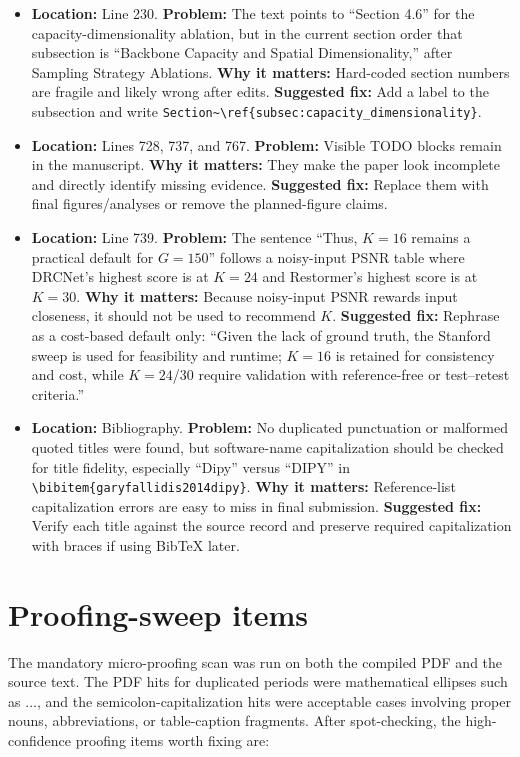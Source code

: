 \documentclass[11pt]{article}
\begin{document}
\begin{itemize}
  \item \textbf{Location:} Line 230. \textbf{Problem:} The text points to ``Section 4.6'' for the capacity-dimensionality ablation, but in the current section order that subsection is ``Backbone Capacity and Spatial Dimensionality,'' after Sampling Strategy Ablations. \textbf{Why it matters:} Hard-coded section numbers are fragile and likely wrong after edits. \textbf{Suggested fix:} Add a label to the subsection and write \texttt{Section\textasciitilde\textbackslash ref\{subsec:capacity\_dimensionality\}}.
  \item \textbf{Location:} Lines 728, 737, and 767. \textbf{Problem:} Visible TODO blocks remain in the manuscript. \textbf{Why it matters:} They make the paper look incomplete and directly identify missing evidence. \textbf{Suggested fix:} Replace them with final figures/analyses or remove the planned-figure claims.
  \item \textbf{Location:} Line 739. \textbf{Problem:} The sentence ``Thus, $K=16$ remains a practical default for $G=150$'' follows a noisy-input PSNR table where DRCNet's highest score is at $K=24$ and Restormer's highest score is at $K=30$. \textbf{Why it matters:} Because noisy-input PSNR rewards input closeness, it should not be used to recommend $K$. \textbf{Suggested fix:} Rephrase as a cost-based default only: ``Given the lack of ground truth, the Stanford sweep is used for feasibility and runtime; $K=16$ is retained for consistency and cost, while $K=24$/$30$ require validation with reference-free or test--retest criteria.''
  \item \textbf{Location:} Bibliography. \textbf{Problem:} No duplicated punctuation or malformed quoted titles were found, but software-name capitalization should be checked for title fidelity, especially ``Dipy'' versus ``DIPY'' in \texttt{\textbackslash bibitem\{garyfallidis2014dipy\}}. \textbf{Why it matters:} Reference-list capitalization errors are easy to miss in final submission. \textbf{Suggested fix:} Verify each title against the source record and preserve required capitalization with braces if using BibTeX later.
\end{itemize}

\section*{Proofing-sweep items}

The mandatory micro-proofing scan was run on both the compiled PDF and the source text. The PDF hits for duplicated periods were mathematical ellipses such as $\ldots$, and the semicolon-capitalization hits were acceptable cases involving proper nouns, abbreviations, or table-caption fragments. After spot-checking, the high-confidence proofing items worth fixing are:
\end{document}
